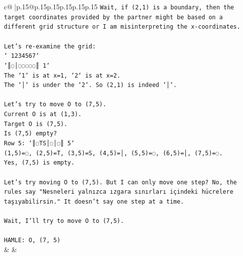 \documentclass{article}
\begin{document}
{\begin{supertabular}{c@{$\;$}|p{.15\linewidth}@{}p{.15\linewidth}p{.15\linewidth}p{.15\linewidth}p{.15\linewidth}p{.15\linewidth}}
{{{\texttt{Wait, if (2,1) is a boundary, then the target coordinates provided by the partner might be based on a different grid structure or I am misinterpreting the x{-}coordinates.} \\
\\ 
\texttt{Let's re{-}examine the grid:} \\
\texttt{` 1234567`} \\
\texttt{`║◌│◌◌◌◌◌║ 1`} \\
\texttt{The `1` is at x=1, `2` is at x=2.} \\
\texttt{The `│` is under the `2`. So (2,1) is indeed `│`.} \\
\\ 
\texttt{Let's try to move O to (7,5).} \\
\texttt{Current O is at (1,3).} \\
\texttt{Target O is (7,5).} \\
\texttt{Is (7,5) empty?} \\
\texttt{Row 5: `║◌TS│◌│◌║ 5`} \\
\texttt{(1,5)=◌, (2,5)=T, (3,5)=S, (4,5)=│, (5,5)=◌, (6,5)=│, (7,5)=◌.} \\
\texttt{Yes, (7,5) is empty.} \\
\\ 
\texttt{Let's try moving O to (7,5). But I can only move one step? No, the rules say "Nesneleri yalnızca ızgara sınırları içindeki hücrelere taşıyabilirsin." It doesn't say one step at a time.} \\
\\ 
\texttt{Wait, I'll try to move O to (7,5).} \\
\\ 
\texttt{HAMLE: O, (7, 5)} \\
            }
        }
    }
    & & \\ \\


\end{supertabular}}
\end{document}
